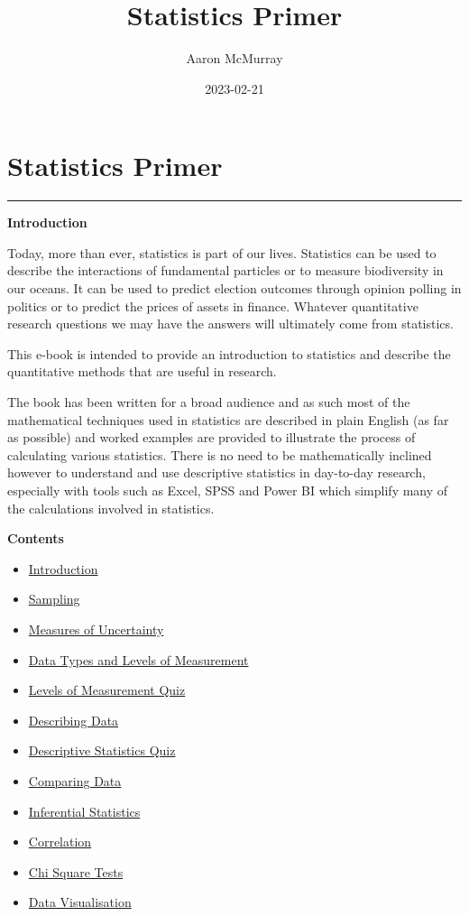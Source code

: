 \documentclass[
]{book}
\title{Statistics Primer}
\author{Aaron McMurray}
\date{2023-02-21}
\providecommand{\tightlist}{%
  \setlength{\itemsep}{0pt}\setlength{\parskip}{0pt}}
\begin{document}
\maketitle

{
\setcounter{tocdepth}{1}
\tableofcontents
}
\hypertarget{Statistics-Primer}{%
\chapter*{Statistics Primer}\label{Statistics-Primer}}

\begin{center}\rule{0.5\linewidth}{0.5pt}\end{center}

\textbf{Introduction}

Today, more than ever, statistics is part of our lives. Statistics can be used to describe the interactions of fundamental particles or to measure biodiversity in our oceans. It can be used to predict election outcomes through opinion polling in politics or to predict the prices of assets in finance. Whatever quantitative research questions we may have the answers will ultimately come from statistics.

This e-book is intended to provide an introduction to statistics and describe the quantitative methods that are useful in research.

The book has been written for a broad audience and as such most of the mathematical techniques used in statistics are described in plain English (as far as possible) and worked examples are provided to illustrate the process of calculating various statistics. There is no need to be mathematically inclined however to understand and use descriptive statistics in day-to-day research, especially with tools such as Excel, SPSS and Power BI which simplify many of the calculations involved in statistics.

\textbf{Contents}

\begin{itemize}
\tightlist
\item
  \protect\hyperlink{intro}{Introduction}
\item
  \protect\hyperlink{sampling}{Sampling}
\item
  \protect\hyperlink{error}{Measures of Uncertainty}
\item
  \protect\hyperlink{datatypes}{Data Types and Levels of Measurement}
\item
  \protect\hyperlink{quizone}{Levels of Measurement Quiz}
\item
  \protect\hyperlink{descdata}{Describing Data}
\item
  \protect\hyperlink{quiztwo}{Descriptive Statistics Quiz}
\item
  \protect\hyperlink{compdat}{Comparing Data}
\item
  \protect\hyperlink{infstat}{Inferential Statistics}
\item
  \protect\hyperlink{correlationchapter}{Correlation}
\item
  \protect\hyperlink{chisq}{Chi Square Tests}
\item
  \protect\hyperlink{datvis}{Data Visualisation}
\end{itemize}
\end{document}
